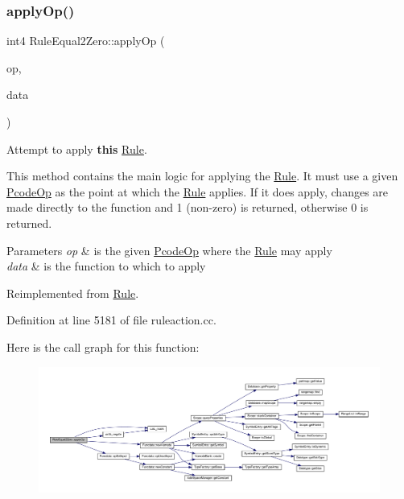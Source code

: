 \subsubsection{\texorpdfstring{applyOp()}{applyOp()}}
{\footnotesize\ttfamily int4 Rule\+Equal2\+Zero\+::apply\+Op (\begin{DoxyParamCaption}\item[{\mbox{\hyperlink{class_pcode_op}{Pcode\+Op}} $\ast$}]{op,  }\item[{\mbox{\hyperlink{class_funcdata}{Funcdata}} \&}]{data }\end{DoxyParamCaption})\hspace{0.3cm}{\ttfamily [virtual]}}



Attempt to apply {\bfseries{this}} \mbox{\hyperlink{class_rule}{Rule}}. 

This method contains the main logic for applying the \mbox{\hyperlink{class_rule}{Rule}}. It must use a given \mbox{\hyperlink{class_pcode_op}{Pcode\+Op}} as the point at which the \mbox{\hyperlink{class_rule}{Rule}} applies. If it does apply, changes are made directly to the function and 1 (non-\/zero) is returned, otherwise 0 is returned. 
\begin{DoxyParams}{Parameters}
{\em op} & is the given \mbox{\hyperlink{class_pcode_op}{Pcode\+Op}} where the \mbox{\hyperlink{class_rule}{Rule}} may apply \\
\hline
{\em data} & is the function to which to apply \\
\hline
\end{DoxyParams}


Reimplemented from \mbox{\hyperlink{class_rule_a4e3e61f066670175009f60fb9dc60848}{Rule}}.



Definition at line 5181 of file ruleaction.\+cc.

Here is the call graph for this function\+:
\nopagebreak
\begin{figure}[H]
\begin{center}
\leavevmode
\includegraphics[width=350pt]{class_rule_equal2_zero_a4451f6e9c8236e504f80f6c57edda360_cgraph}
\end{center}
\end{figure}
\mbox{\label{class_rule_equal2_zero_ac77dab90494d8a0d1ca81c6c5a2e0962}} 
